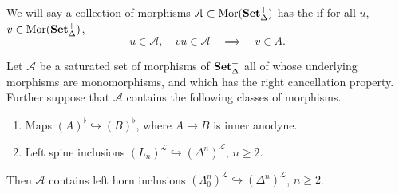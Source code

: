 \documentclass[main.tex]{subfiles}
\begin{document}
\begin{definition}
  \label{def:right_cancellation_property}
  We will say a collection of morphisms $\mathcal{A} \subset \mathrm{Mor}(\mathbf{Set}_{\Delta}^{+})$ has the  if for all $u$, $v \in \mathrm{Mor}(\mathbf{Set}_{\Delta}^{+})$,
  \begin{equation*}
    u \in \mathcal{A},\quad vu \in \mathcal{A} \quad \implies \quad v \in A.
  \end{equation*}
\end{definition}

\begin{lemma}
  \label{lemma:saturated_hull_of_left_spine_inclusions}
  Let $\mathcal{A}$ be a saturated set of morphisms of $\mathbf{Set}_{\Delta}^{+}$ all of whose underlying morphisms are monomorphisms, and which has the right cancellation property. Further suppose that $\mathcal{A}$ contains the following classes of morphisms.
  \begin{enumerate}
    \item Maps $(A)^{\flat} \hookrightarrow (B)^{\flat}$, where $A \to B$ is inner anodyne.

    \item Left spine inclusions $(L_{n})^{\mathcal{L}} \hookrightarrow (\Delta^{n})^{\mathcal{L}}$, $n \geq 2$.
  \end{enumerate}

  Then $\mathcal{A}$ contains left horn inclusions $(\Lambda^{n}_{0})^{\mathcal{L}} \hookrightarrow (\Delta^{n})^{\mathcal{L}}$, $n \geq 2$.
\end{lemma}
\end{document}
